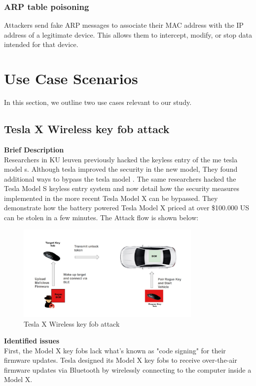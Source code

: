 \documentclass{report}
\begin{document}
\subsubsection{ARP table poisoning}
Attackers send fake ARP messages to associate their MAC address with the IP address of a legitimate device. This allows them to intercept, modify, or stop data intended for that device.

\section{Use Case Scenarios}

In this section, we outline two use cases relevant to our study.

\subsection{Tesla X Wireless key fob  attack}
\textbf{Brief Description}\\
Researchers in KU leuven previously hacked the keyless entry of the me tesla model s. Although tesla improved the security in the new model, They found additional ways to bypass the tesla model . The same researchers hacked the Tesla Model S keyless entry system and now detail how the security measures implemented in the more recent Tesla Model X can be bypassed. They demonstrate how the battery powered Tesla Model X priced at over \$100.000 US can be stolen in a few minutes. The  Attack flow is shown below:
\begin{figure}[h]
    \centering
    \includegraphics[width=0.8\textwidth]{figures/tesla.jpg}
    \caption{Tesla X Wireless key fob  attack}
    \label{fig:Tesla X Wireless key fob  attack}
\end{figure}
\textbf{Identified issues}\\
First, the Model X key fobs lack what's known as "code signing" for their firmware updates. Tesla designed its Model X key fobs to receive over-the-air firmware updates via Bluetooth by wirelessly connecting to the computer inside a Model X.
\end{document}
